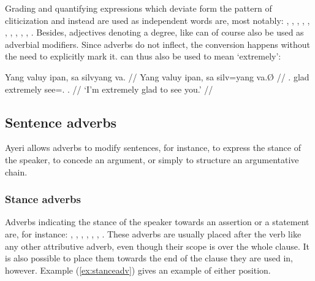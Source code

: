 Grading and quantifying expressions which deviate form the pattern of 
cliticization and instead are used as independent words are, most notably:
,
,
,
,
,
,
,
,
,
,
.
Besides, adjectives denoting a degree, like  can of course also be used as adverbial modifiers. Since adverbs do
not inflect, the conversion happens without the need to explicitly mark it.
 can thus also be used to mean `extremely':

\ex
\begingl
	\gla Yang valuy ipan, sa silvyang va. //
	\glb Yang valuy ipan, sa silv=yang va.Ø //
	\glc \Fsg{}.\Aarg{} glad extremely \PatT{} see=\Fsg{}.\Aarg{} 
		\Ssg{}.\Top{} //
	\glft `I'm extremely glad to see you.' //
\endgl
\xe


\subsection{Sentence adverbs}

Ayeri allows adverbs to modify sentences, for instance, to express the stance
of the speaker, to concede an argument, or simply to structure an argumentative
chain.

\subsubsection{Stance adverbs}

Adverbs indicating the stance of the speaker towards an assertion or a 
statement are, for instance:
, 
,
,
,
,
,
.
These adverbs are usually placed after the verb like any other attributive 
adverb, even though their scope is over the whole clause. It is also possible 
to place them towards the end of the clause they are used in, however. Example 
(\ref{ex:stanceadv}) gives an example of either position.

